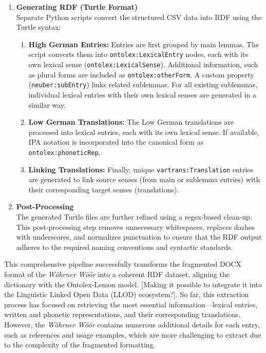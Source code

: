 \documentclass{article}
\begin{document}
\begin{enumerate}
    \item \textsf{\textbf{Generating RDF (Turtle Format)}}\\ 
    Separate Python scripts convert the structured CSV data into RDF using the Turtle syntax:
    \begin{enumerate}
        \item \textsf{\textbf{High German Entries:}} Entries are first grouped by main lemmas. The script converts them into \texttt{ontolex:LexicalEntry} nodes, each with its own lexical sense (\texttt{ontolex:LexicalSense}). Additional information, such as plural forms are included as \texttt{ontolex:otherForm}. A custom property (\texttt{neuber:subEntry}) links related sublemmas. For all existing sublemmas, individual lexical entries with their own lexical senses are generated in a similar way.
        \item \textsf{\textbf{Low German Translations:}} The Low German translations are processed into lexical entries, each with its own lexical sense. If available, IPA notation is incorporated into the canonical form as \texttt{ontolex:phoneticRep}.
        \item \textsf{\textbf{Linking Translations:}} Finally, unique \texttt{vartrans:Translation} entries are generated to link source senses (from main or sublemma entries) with their corresponding target senses (translations).
    \end{enumerate}

    \item \textsf{\textbf{Post-Processing}}\\  
    The generated Turtle files are further refined using a regex-based clean-up. This post-processing step removes unnecessary whitespaces, replaces dashes with underscores, and normalizes punctuation to ensure that the RDF output adheres to the required naming conventions and syntactic standards.
\end{enumerate}

This comprehensive pipeline successfully transforms the fragmented DOCX format of the \emph{Wöhrner Wöör} into a coherent RDF dataset, aligning the dictionary with the Ontolex-Lemon model. [Making it possible to integrate it into the Linguistic Linked Open Data (LLOD) ecosystem?]. So far, this extraction process has focused on retrieving the most essential information—lexical entries, written and phonetic representations, and their corresponding translations. However, the \emph{Wöhrner Wöör} contains numerous additional details for each entry, such as references and usage examples, which are more challenging to extract due to the complexity of the fragmented formatting.
\end{document}
